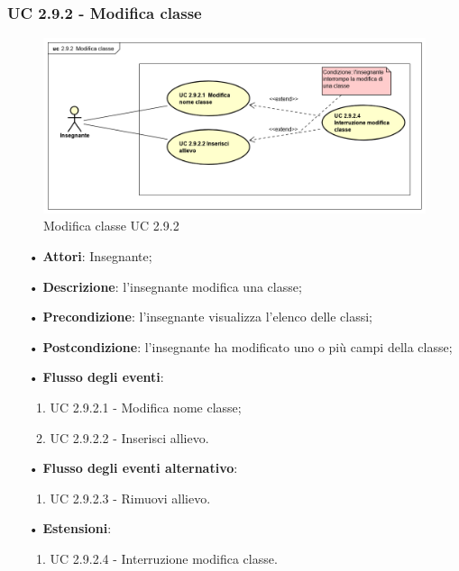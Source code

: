 \subsubsection{UC 2.9.2 - Modifica classe}
\begin{figure}[H]
	\centering
	\includegraphics[width=17cm]{img/ModificaClasse.png} 
	\caption{Modifica classe UC 2.9.2}
\end{figure}

\begin{itemize}
	\item[•] \textbf{Attori}: Insegnante;
	\item[•] \textbf{Descrizione}: l'insegnante modifica una classe;
	\item[•] \textbf{Precondizione}: l'insegnante visualizza l'elenco delle classi;
	\item[•] \textbf{Postcondizione}: l'insegnante ha modificato uno o più campi della classe;
	\item[•] \textbf{Flusso degli eventi}:
	\begin{enumerate}
		\item UC 2.9.2.1 - Modifica nome classe;
		\item UC 2.9.2.2 - Inserisci allievo.
	\end{enumerate}
	\item[•] \textbf{Flusso degli eventi alternativo}:
	\begin{enumerate}
		\item UC 2.9.2.3 - Rimuovi allievo.
	\end{enumerate}
	\item[•] \textbf{Estensioni}:	
	\begin{enumerate}
		\item UC 2.9.2.4 - Interruzione modifica classe.
	\end{enumerate}
\end{itemize}

